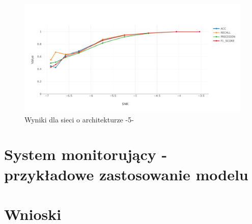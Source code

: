 \documentclass[12pt, a4paper, oneside]{article}
\begin{document}
	\begin{figure}[H]
		\centering
		\includegraphics[width=14cm]{images/nn_small_5.pdf}
		\caption{Wyniki dla sieci o architekturze -5-}
	\end{figure}


	
	

	
	\newpage
	\section{System monitorujący - przykładowe zastosowanie modelu}
	\newpage
	\section{Wnioski}
	\newpage
	
	
	
	
\end{document}
